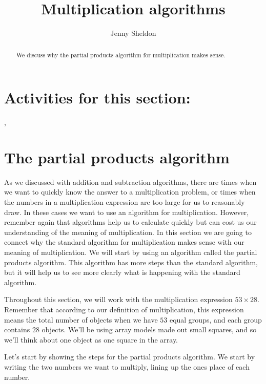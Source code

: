 \documentclass{ximera}
\title{Multiplication algorithms}
\author{Jenny Sheldon}
\begin{document}
\begin{abstract}
We discuss why the partial products algorithm for multiplication makes sense.
\end{abstract}
\maketitle

\section{Activities for this section:} 
, 

\section{The partial products algorithm}

As we discussed with addition and subtraction algorithms, there are times when we want to quickly know the answer to a multiplication problem, or times when the numbers in a multiplication expression are too large for us to reasonably draw. In these cases we want to use an algorithm for multiplication.  However, remember again that algorithms help us to calculate quickly but can cost us our understanding of the meaning of multiplication. In this section we are going to connect why the standard algorithm for multiplication makes sense with our meaning of multiplication. We will start by using an algorithm called the partial products algorithm. This algorithm has more steps than the standard algorithm, but it will help us to see more clearly what is happening with the standard algorithm.

Throughout this section, we will work with the multiplication expression $53 \times 28$. Remember that according to our definition of multiplication, this expression means the total number of objects when we have $53$ equal groups, and each group contains $28$ objects. We'll be using array models made out small squares, and so we'll think about one object as one square in the array.

Let's start by showing the steps for the partial products algorithm. We start by writing the two numbers we want to multiply, lining up the ones place of each number.
\end{document}
